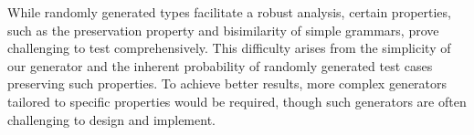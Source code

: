 While randomly generated types facilitate a robust analysis, certain properties, such as the preservation property and bisimilarity of simple grammars, prove challenging to test comprehensively. This difficulty arises from the simplicity of our generator and the inherent probability of randomly generated test cases preserving such properties. To achieve better results, more complex generators tailored to specific properties would be required, though such generators are often challenging to design and implement. 
